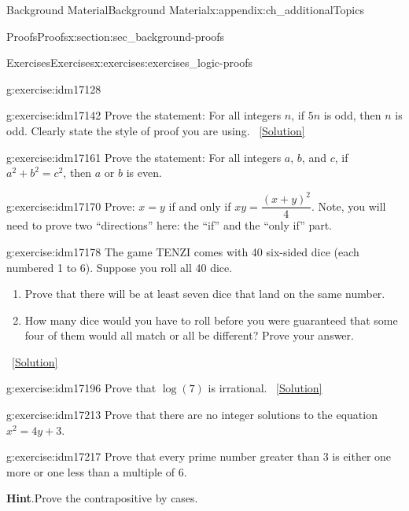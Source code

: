 \documentclass[oneside,10pt,]{book}
\numberwithin{equation}{chapter}
\begin{document}
\begin{appendixptx}{Background Material}{}{Background Material}{}{}{x:appendix:ch_additionalTopics}
\begin{sectionptx}{Proofs}{}{Proofs}{}{}{x:section:sec_background-proofs}
\begin{exercises-subsection}{Exercises}{}{Exercises}{}{}{x:exercises:exercises_logic-proofs}
\begin{divisionexercise}{7}{}{}{g:exercise:idm17128}
%
\end{divisionexercise}%
\begin{divisionexercise}{8}{}{}{g:exercise:idm17142}%
Prove the statement: For all integers \(n\), if \(5n\) is odd, then \(n\) is odd. Clearly state the style of proof you are using.%
\qquad~\hfill{\tiny\hyperlink{g:solution:idm17148-main}{[Solution]}}\end{divisionexercise}%
\begin{divisionexercise}{9}{}{}{g:exercise:idm17161}%
Prove the statement: For all integers \(a\), \(b\), and \(c\), if \(a^2 + b^2 = c^2\), then \(a\) or \(b\) is even.%
\end{divisionexercise}%
\begin{divisionexercise}{10}{}{}{g:exercise:idm17170}%
Prove: \(x=y\) if and only if \(xy=\dfrac{(x+y)^2}{4}\). Note, you will need to prove two ``directions'' here: the ``if'' and the ``only if'' part.%
\end{divisionexercise}%
\begin{divisionexercise}{11}{}{}{g:exercise:idm17178}%
The game TENZI comes with 40 six-sided dice (each numbered 1 to 6). Suppose you roll all 40 dice.%
\begin{enumerate}[label=(\alph*)]
\item{}Prove that there will be at least seven dice that land on the same number.%
\item{}How many dice would you have to roll before you were guaranteed that some four of them would all match or all be different? Prove your answer.%
\end{enumerate}
%
\qquad~\hfill{\tiny\hyperlink{g:solution:idm17185-main}{[Solution]}}\end{divisionexercise}%
\begin{divisionexercise}{12}{}{}{g:exercise:idm17196}%
Prove that \(\log(7)\) is irrational.%
\qquad~\hfill{\tiny\hyperlink{g:solution:idm17200-main}{[Solution]}}\end{divisionexercise}%
\begin{divisionexercise}{13}{}{}{g:exercise:idm17213}%
Prove that there are no integer solutions to the equation \(x^2 = 4y + 3\).%
\end{divisionexercise}%
\begin{divisionexercise}{14}{}{}{g:exercise:idm17217}%
Prove that every prime number greater than 3 is either one more or one less than a multiple of 6.%
\par\smallskip%
\noindent\textbf{Hint}.\hypertarget{g:hint:idm17220}{}\quad{}Prove the contrapositive by cases.%

\end{divisionexercise}
\end{exercises-subsection}
\end{sectionptx}
\end{appendixptx}
\end{document}
